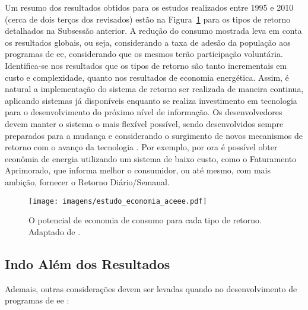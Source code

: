 Um resumo dos resultados obtidos para os estudos realizados entre 1995 e 
2010 (cerca de dois terços dos revisados) estão na 
Figura~\ref{fig:potencial_consumo_retorno} para os tipos de retorno 
detalhados na Subsessão anterior. A redução do consumo mostrada leva em conta os
resultados globais, ou seja, considerando a taxa de adesão da população aos
programas de \gls{ee}, considerando que os mesmos terão participação voluntária. 
Identifica-se nos resultados que os tipos de retorno são tanto incrementais
em custo e complexidade, quanto nos resultados de economia energética. Assim, 
é natural a implementação do sistema de retorno ser realizada de 
maneira continua, aplicando sistemas já disponíveis enquanto se realiza 
investimento em tecnologia para o desenvolvimento do
próximo nível de informação. Os desenvolvedores devem
manter o sistema o mais flexível possível, sendo desenvolvidos 
sempre preparados para a mudança e considerando o surgimento de novos 
mecanismos de retorno com o avanço da tecnologia 
\cite{aceee_2010_estudos_feedback}. Por exemplo, por ora é possível obter
econômia de energia utilizando um sistema de baixo custo, como o Faturamento
Aprimorado, que informa melhor o consumidor, ou até mesmo, com mais ambição, 
fornecer o Retorno Diário/Semanal.

\begin{figure}[h!t]
\centering
\texttt{[image: imagens/estudo\_economia\_aceee.pdf]}
\caption[O potencial de consumo para cada tipo de retorno]
{O potencial de economia de consumo para cada tipo de retorno. 
Adaptado de \cite{aceee_2010_estudos_feedback}.}
\label{fig:potencial_consumo_retorno}
\end{figure}


\subsection{Indo Além dos Resultados}
\label{ssec:ret_outros}

Ademais, outras considerações devem ser levadas quando no desenvolvimento 
de programas de \gls{ee} \cite{aceee_2010_estudos_feedback,2006_darby,2009_epri}:

